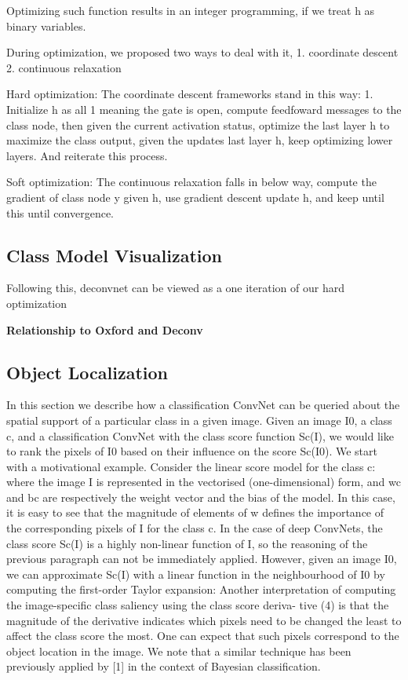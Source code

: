 
Optimizing such function results in an integer programming, if we treat h as binary variables. 

During optimization, we proposed two ways to deal with it, 1. coordinate descent 2. continuous relaxation

Hard optimization: The coordinate descent frameworks stand in this way: 1. Initialize h as all 1 meaning the gate is open, compute feedfoward messages to the class node, then given the current activation status, optimize the last layer h to maximize the class output, given the updates last layer h, keep optimizing lower layers. And reiterate this process.

Soft optimization: The continuous relaxation falls in below way, compute the gradient of class node y given h, use gradient descent update h, and keep until this until convergence.

\subsection{Class Model Visualization}

Following this, deconvnet can be viewed as a one iteration of our hard optimization

\textbf{Relationship to Oxford and Deconv}

\subsection{Object Localization}

In this section we describe how a classification ConvNet can be queried about the spatial support of a particular class in a given image. Given an image I0, a class c, and a classification ConvNet with the class score function Sc(I), we would like to rank the pixels of I0 based on their influence on the score Sc(I0). 
We start with a motivational example. Consider the linear score model for the class c: 
where the image I is represented in the vectorised (one-dimensional) form, and wc and bc are respectively the weight vector and the bias of the model. In this case, it is easy to see that the magnitude of elements of w defines the importance of the corresponding pixels of I for the class c. 
In the case of deep ConvNets, the class score Sc(I) is a highly non-linear function of I, so the reasoning of the previous paragraph can not be immediately applied. However, given an image I0, we can approximate Sc(I) with a linear function in the neighbourhood of I0 by computing the first-order Taylor expansion: 
Another interpretation of computing the image-specific class saliency using the class score deriva- tive (4) is that the magnitude of the derivative indicates which pixels need to be changed the least to affect the class score the most. One can expect that such pixels correspond to the object location in the image. We note that a similar technique has been previously applied by [1] in the context of Bayesian classification. 


